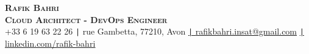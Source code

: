 \begin{center}
    \textbf{\Huge \scshape Rafik Bahri} \\ \vspace{5pt}
    \textbf{ \scshape Cloud Architect - DevOps Engineer} \\ \vspace{5pt}
    \small +33 6 19 63 22 26 \quad
    {\texttt{|}  rue Gambetta, 77210, Avon} \quad
    \href{mailto:rafikbahri.insat@gmail.com}{\texttt{|} \quad \underline{rafikbahri.insat@gmail.com}} \quad
    \href{https://www.linkedin.com/in/rafik-bahri/}{\texttt{|} \quad \underline{linkedin.com/rafik-bahri}}
    \quad
\end{center}